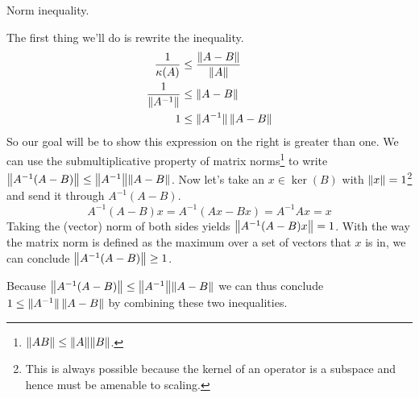 \documentclass[boxes,pages]{homework}
\newcommand{\inv}[1]{#1^{-1}}
\begin{document}
\begin{problem}
Norm inequality.
\end{problem}

\begin{solution}
	The first thing we'll do is rewrite the inequality.
	\begin{align*}
		\frac{1}{\kappa(A)}      & \leq \frac{\norm{A - B}}{\norm{A}} \\
		\frac{1}{\norm{\inv{A}}} & \leq \norm{A - B}                  \\
		1                        & \leq \norm*{\inv{A}}\norm{A - B}
	\end{align*}
	So our goal will be to show this expression on the right is greater than one. We can use the submultiplicative property of matrix norms\footnote{$\norm{AB} \leq \norm{A}\norm{B}$.} to write $\norm{\inv{A}(A - B)} \leq \norm{\inv{A}}\norm{A- B}$. Now let's take an $x\in\ker(B)$ with $\norm{x} = 1$\footnote{This is always possible because the kernel of an operator is a subspace and hence must be amenable to scaling.} and send it through $\inv{A}(A - B)$.
	\begin{equation*}
		\inv{A}(A - B)x = \inv{A}(Ax - Bx) = \inv{A}Ax = x
	\end{equation*}
	Taking the (vector) norm of both sides yields $\norm{\inv{A}(A - B)x} = 1$. With the way the matrix norm is defined as the maximum over a set of vectors that $x$ is in, we can conclude $\norm{\inv{A}(A-B)} \geq 1$.

	Because $\norm{\inv{A}(A - B)} \leq \norm{\inv{A}}\norm{A- B}$ we can thus conclude $1\leq \norm*{\inv{A}}\norm{A - B}$ by combining these two inequalities.
\end{solution}
\end{document}
